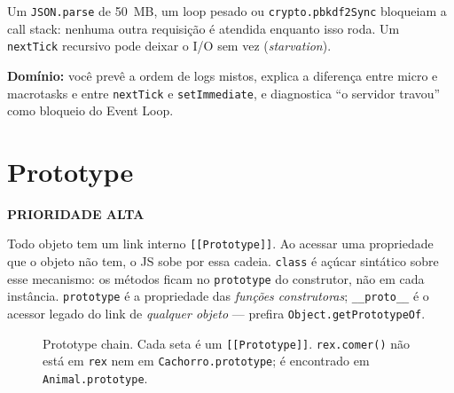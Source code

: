 \documentclass[12pt,a4paper,oneside]{book}
\newcommand{\alta}{\colorbox{red!15}{\sffamily\scriptsize\bfseries PRIORIDADE ALTA}}
\newcommand{\code}[1]{\texttt{#1}}
\newcommand{\dom}[1]{\begin{dominio}\textbf{Domínio:} #1\end{dominio}}
\begin{document}
\begin{cuidado}
Um \code{JSON.parse} de 50~MB, um loop pesado ou \code{crypto.pbkdf2Sync} bloqueiam a call stack: nenhuma outra requisição é atendida enquanto isso roda. Um \code{nextTick} recursivo pode deixar o I/O sem vez (\emph{starvation}).
\end{cuidado}

\dom{você prevê a ordem de logs mistos, explica a diferença entre micro e macrotasks e entre \code{nextTick} e \code{setImmediate}, e diagnostica ``o servidor travou'' como bloqueio do Event Loop.}

\section{Prototype}
\label{sec:prototype}
\alta

Todo objeto tem um link interno \code{[[Prototype]]}. Ao acessar uma propriedade que o objeto não tem, o JS sobe por essa cadeia. \code{class} é açúcar sintático sobre esse mecanismo: os métodos ficam no \code{prototype} do construtor, não em cada instância. \code{prototype} é a propriedade das \emph{funções construtoras}; \code{\_\_proto\_\_} é o acessor legado do link de \emph{qualquer objeto} --- prefira \code{Object.getPrototypeOf}.

\begin{figure}[h]
\centering
{}
\caption{Prototype chain. Cada seta é um \texttt{[[Prototype]]}. \texttt{rex.comer()} não está em \texttt{rex} nem em \texttt{Cachorro.prototype}; é encontrado em \texttt{Animal.prototype}.}
\end{figure}
\end{document}
